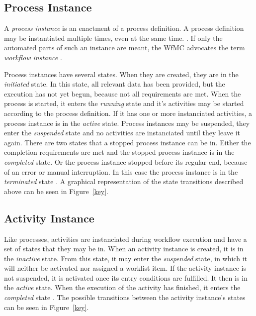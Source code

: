   \subsection{Process Instance} %
  \label{sub:process_instance}
    A \emph{process instance} is an enactment of a process definition. A process definition may be instantiated multiple times, even at the same time. \cite{Casati1999Specification}. If only the automated parts of such an instance are meant, the \ac{WfMC} advocates the term \emph{workflow instance} \cite{Hollingsworth1995WfMC}.

    Process instances have several states. When they are created, they are in the \emph{initiated} state. In this state, all relevant data has been provided, but the execution has not yet begun, \eg because not all requirements are met. When the process is started, it enters the \emph{running} state and it's activities may be started according to the process definition. If it has one or more instanciated activities, a process instance is in the \emph{active} state. Process instances may be suspended, \ie they enter the \emph{suspended} state and no activities are instanciated until they leave it again. There are two states that a stopped process instance can be in. Either the completion requirements are met and the stopped process instance is in the \emph{completed} state. Or the process instance stopped before its regular end, \ie because of an error or manual interruption. In this case the process instance is in the \emph{terminated} state \cite{Hollingsworth1995WfMC}. A graphical representation of the state transitions described above can be seen in Figure~\ref{key}.


  \subsection{Activity Instance} %
  \label{sub:activity_instance}
    Like processes, activities are instanciated during workflow execution and have a set of states that they may be in. When an activity instance is created, it is in the \emph{inactive} state. From this state, it may enter the \emph{suspended} state, in which it will neither be activated nor assigned a worklist item. If the activity instance is not suspended, it is activated once its entry conditions are fulfilled. It then is in the \emph{active} state. When the execution of the activity has finished, it enters the \emph{completed} state \cite{Hollingsworth1995WfMC}. The possible transitions between the activity instance's states can be seen in Figure~\ref{key}.

